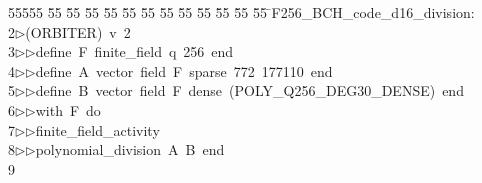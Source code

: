 %
%
\begin{tabbing}
55555 \= 55 \= 55 \= 55 \= 55 \= 55 \= 55 \= 55 \= 55 \= 55 \= 55 \= 55 \= 55 \= \>F256\_BCH\_code\_d16\_division:\\[0pt]
2\>$\triangleright$\>(ORBITER)\ v\ 2\ \\[0pt]
3\>$\triangleright$\>$\triangleright$\>define\ F\ finite\_field\ q\ 256\ end\ \\[0pt]
4\>$\triangleright$\>$\triangleright$\>define\ A\ vector\ field\ F\ sparse\ 772\ 177110\ end\ \\[0pt]
5\>$\triangleright$\>$\triangleright$\>define\ B\ vector\ field\ F\ dense\ (POLY\_Q256\_DEG30\_DENSE)\ end\ \\[0pt]
6\>$\triangleright$\>$\triangleright$\>with\ F\ do\ \\[0pt]
7\>$\triangleright$\>$\triangleright$\>finite\_field\_activity\ \\[0pt]
8\>$\triangleright$\>$\triangleright$\>polynomial\_division\ A\ B\ end\\[0pt]
9\>\end{tabbing}

